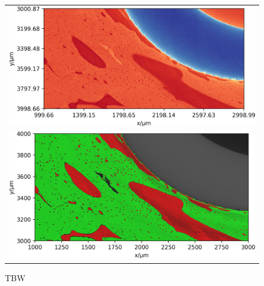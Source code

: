 \begin{figure}
  \centering
  \begin{tabular}{c}
    \includegraphics[width=\linewidth]{figures/770c_pag-bic-xy-1x} \\
    \includegraphics[width=\linewidth]{figures/770c_pag-bic-P01-xy-1x}
  \end{tabular}
  \caption{TBW}
  \label{fig:histology-comparison1}
\end{figure}

